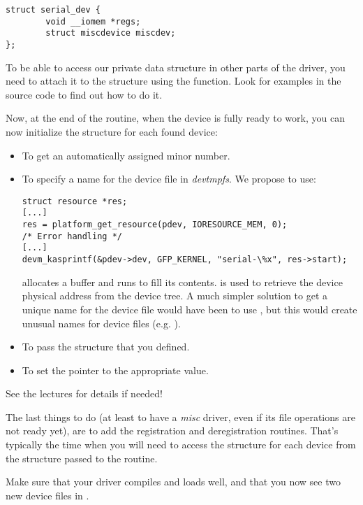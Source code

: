 \begin{verbatim}
struct serial_dev {
        void __iomem *regs;
        struct miscdevice miscdev;
};
\end{verbatim}

To be able to access our private data structure in other parts of the
driver, you need to attach it to the  structure using the
 function. Look for examples in the
source code to find out how to do it.

Now, at the end of the  routine, when the device is fully ready
to work, you can now initialize the  structure
for each found device:

\begin{itemize}
\item To get an automatically assigned minor number.
\item To specify a name for the device file in {\em devtmpfs}. We
  propose to use:
  \begin{verbatim}
struct resource *res;
[...]
res = platform_get_resource(pdev, IORESOURCE_MEM, 0);
/* Error handling */
[...]
devm_kasprintf(&pdev->dev, GFP_KERNEL, "serial-\%x", res->start);
  \end{verbatim}
   allocates a buffer and runs 
  to fill its contents.  is used to
  retrieve the device physical address from the device tree.
  A much simpler solution to get a unique name for the device file
  would have been to use , but this would create
  unusual names for device files (e.g. ).
\item To pass the  structure that you defined.
\item To set the  pointer to the appropriate value.
\end{itemize}

See the lectures for details if needed!

The last things to do (at least to have a {\em misc} driver, even if
its file operations are not ready yet), are to add the registration and
deregistration routines. That's typically the time when you will need
to access the  structure for each device from the
 structure passed to the  routine.

Make sure that your driver compiles and loads well, and that you
now see two new device files in .

